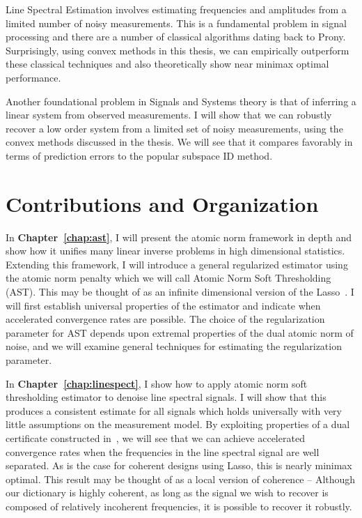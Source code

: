 Line Spectral Estimation involves estimating frequencies and amplitudes from a
limited number of noisy measurements. This is a fundamental problem in signal
processing and there are a number of classical algorithms dating back to Prony.
Surprisingly, using convex methods in this thesis, we can empirically outperform
these classical techniques and also theoretically show near minimax optimal
performance.

Another foundational problem in Signals and Systems theory is that of inferring
a linear system from observed measurements. I will show that we can robustly
recover a low order system from a limited set of noisy measurements, using the
convex methods discussed in the thesis. We will see that it compares favorably
in terms of prediction errors to the popular subspace ID method.

\section*{Contributions and Organization} %
\label{sec:contributions}

In \textbf{Chapter~\ref{chap:ast}}, I will present the atomic norm framework in
depth and show how it unifies many linear inverse problems in high dimensional
statistics. Extending this framework, I will introduce a general regularized
estimator using the atomic norm penalty which we will call Atomic Norm Soft
Thresholding (AST). This may be thought of as an infinite dimensional version of
the Lasso~\cite{tibshirani96}. I will first establish universal properties of
the estimator and indicate when accelerated convergence rates are possible. The
choice of the regularization parameter for AST depends upon extremal properties
of the dual atomic norm of noise, and we will examine general techniques for
estimating the regularization parameter.

In \textbf{Chapter~\ref{chap:linespect}}, I show how to apply atomic norm soft
thresholding estimator to denoise line spectral signals. I will show that this
produces a consistent estimate for all signals which holds universally with very
little assumptions on the measurement model. By exploiting properties of a dual
certificate constructed in~\cite{CandesGranda,cg_noisy}, we will see that we can
achieve accelerated convergence rates when the frequencies in the line spectral
signal are well separated. As is the case for coherent designs using Lasso, this
is nearly minimax optimal. This result may be thought of as a local version of
coherence -- Although our dictionary is highly coherent, as long as the signal
we wish to recover is composed of relatively incoherent frequencies, it is
possible to recover it robustly.


